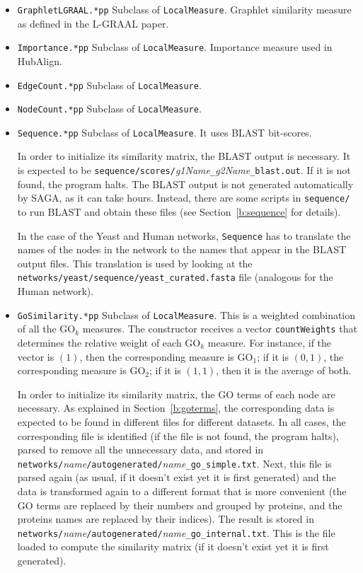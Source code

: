 \documentclass[]{article}
\begin{document}
\begin{itemize}
\item \texttt{GraphletLGRAAL.*pp} Subclass of \texttt{LocalMeasure}. Graphlet similarity measure as defined in the L-GRAAL paper.

\item \texttt{Importance.*pp} Subclass of \texttt{LocalMeasure}. Importance measure used in HubAlign.

\item \texttt{EdgeCount.*pp} Subclass of \texttt{LocalMeasure}.

\item \texttt{NodeCount.*pp} Subclass of \texttt{LocalMeasure}.

\item \texttt{Sequence.*pp} Subclass of \texttt{LocalMeasure}. It uses BLAST bit-scores.

In order to initialize its similarity matrix, the BLAST output is necessary. It is expected to be \texttt{sequence/scores/}\textit{g1Name}\texttt{\_}\textit{g2Name}\texttt{\_blast.out}. If it is not found, the program halts. The BLAST output is not generated automatically by SAGA, as it can take hours. Instead, there are some scripts in \texttt{sequence/} to run BLAST and obtain these files (see Section~\ref{b:sequence} for details).

In the case of the Yeast and Human networks, \texttt{Sequence} has to translate the names of the nodes in the network to the names that appear in the BLAST output files. This translation is used by looking at the \texttt{networks/yeast/sequence/yeast\_curated.fasta} file (analogous for the Human network).

\item \texttt{GoSimilarity.*pp} Subclass of \texttt{LocalMeasure}. This is a weighted combination of all the $\mbox{GO}_k$ measures. The constructor receives a vector \texttt{countWeights} that determines the relative weight of each $\mbox{GO}_k$ measure. For instance, if the vector is $(1)$, then the corresponding measure is $\mbox{GO}_1$; if it is $(0,1)$, the corresponding measure is $\mbox{GO}_2$; if it is $(1,1)$, then it is the average of both.

In order to initialize its similarity matrix, the GO terms of each node are necessary. As explained in Section~\ref{b:goterms}, the corresponding data is expected to be found in different files for different datasets. In all cases, the corresponding file is identified (if the file is not found, the program halts), parsed to remove all the unnecessary data, and stored in\\ \texttt{networks/}\textit{name}\texttt{/autogenerated/}\textit{name}\texttt{\_go\_simple.txt}. Next, this file is parsed again (as usual, if it doesn't exist yet it is first generated) and the data is transformed again to a different format that is more convenient (the GO terms are replaced by their numbers and grouped by proteins, and the proteins names are replaced by their indices). The result is stored in \texttt{networks/}\textit{name}\texttt{/autogenerated/}\textit{name}\texttt{\_go\_internal.txt}. This is the file loaded to compute the similarity matrix (if it doesn't exist yet it is first generated).


\end{itemize}
\end{document}
